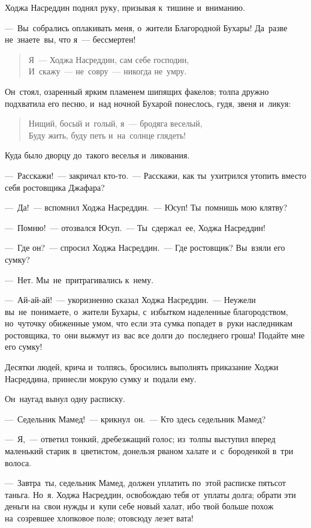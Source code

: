 \documentclass[12pt,a4paper]{book}
\begin{document}
Ходжа Насреддин поднял руку, призывая к~тишине и~вниманию.

—~Вы~собрались оплакивать меня, о~жители Благородной Бухары! Да~разве не~знаете~вы, что я~— бессмертен!

\begin{verse}
Я~— Ходжа Насреддин, сам себе господин, \\
И~скажу~— не~совру~— никогда не~умру.	
\end{verse}

Он~стоял, озаренный ярким пламенем шипящих факелов; толпа дружно подхватила его песню, и~над ночной Бухарой понеслось, гудя, звеня и~ликуя:

\begin{verse}
Нищий, босый и~голый, я~— бродяга веселый, \\
Буду жить, буду петь и~на~солнце глядеть!
\end{verse}

Куда было дворцу до~такого веселья и~ликования.

—~Расскажи!~— закричал кто-то.~— Расскажи, как ты~ухитрился утопить вместо себя ростовщика Джафара?

—~Да!~— вспомнил Ходжа Насреддин.~— Юсуп! Ты~помнишь мою клятву?

—~Помню!~— отозвался Юсуп.~— Ты~сдержал~ее, Ходжа Насреддин!

—~Где он?~— спросил Ходжа Насреддин.~— Где ростовщик? Вы~взяли его сумку?

—~Нет. Мы~не~притрагивались к~нему.

—~Ай-ай-ай!~— укоризненно сказал Ходжа Насреддин.~— Неужели вы~не~понимаете, о~жители Бухары, с~избытком наделенные благородством, но~чуточку обиженные умом, что если эта сумка попадет в~руки наследникам ростовщика, то~они выжмут из~вас все долги до~последнего гроша! Подайте мне его сумку!

Десятки людей, крича и~толпясь, бросились выполнять приказание Ходжи Насреддина, принесли мокрую сумку и~подали ему.

Он~наугад вынул одну расписку.

—~Седельник Мамед!~— крикнул~он.~— Кто здесь седельник Мамед?

—~Я,~— ответил тонкий, дребезжащий голос; из~толпы выступил вперед маленький старик в~цветистом, донельзя рваном халате и~с~бороденкой в~три волоса.

—~Завтра~ты, седельник Мамед, должен уплатить по~этой расписке пятьсот таньга. Но~я. Ходжа Насреддин, освобождаю тебя от~уплаты долга; обрати эти деньги на~свои нужды и~купи себе новый халат, ибо твой больше похож на~созревшее хлопковое поле; отовсюду лезет вата!
\end{document}
